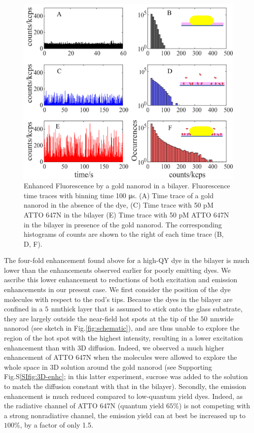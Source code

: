 \documentclass[journal=jpccck,manuscript=article]{achemso}
\newcommand{\nm}{\ensuremath{\,\textrm{nm}}}
\begin{document}
\begin{figure}
	\centering
	\includegraphics[]{timetrace_hist.png}
	\caption{Enhanced Fluorescence by a gold nanorod in a bilayer. Fluorescence time traces with binning time 100 μs. (A) Time trace of a gold nanorod in the absence of the dye, (C) Time trace with 50 pM ATTO 647N in the bilayer (E) Time trace with 50 pM ATTO 647N in the bilayer in presence of the gold nanorod. The corresponding histograms of counts are shown to the right of each time trace (B, D, F).}
	\label{fig:timetrace_hist}
\end{figure}
The four-fold enhancement found above for a high-QY dye in the bilayer is much lower than the enhancements observed earlier for poorly emitting dyes.\cite{yuan2013thousandfold} We ascribe this lower enhancement to reductions of both excitation and emission enhancements in our present case. We first consider the position of the dye molecules with respect to the rod’s tips. Because the dyes in the bilayer are confined in a $5~$\nm thick layer that is assumed to stick onto the glass substrate, they are largely outside the near-field hot spots at the tip of the $50~$\nm wide nanorod (see sketch in Fig.\ref{fig:schematic}), and are thus unable to explore the region of the hot spot with the highest intensity, resulting in a lower excitation enhancement than with 3D diffusion. Indeed, we observed a much higher enhancement of ATTO 647N when the molecules were allowed to explore the whole space in 3D solution around the gold nanorod (see Supporting Fig.S\ref{SIfig:3D-enhc}; in this latter experiment, sucrose was added to the solution to match the diffusion constant with that in the bilayer). Secondly, the emission enhancement is much reduced compared to low-quantum yield dyes. Indeed, as the radiative channel of ATTO 647N (quantum yield $65$\%) is not competing with a strong nonradiative channel, the emission yield can at best be increased up to $100$\%, by a factor of only 1.5.\cite{khatua2014resonant}\\
\end{document}
